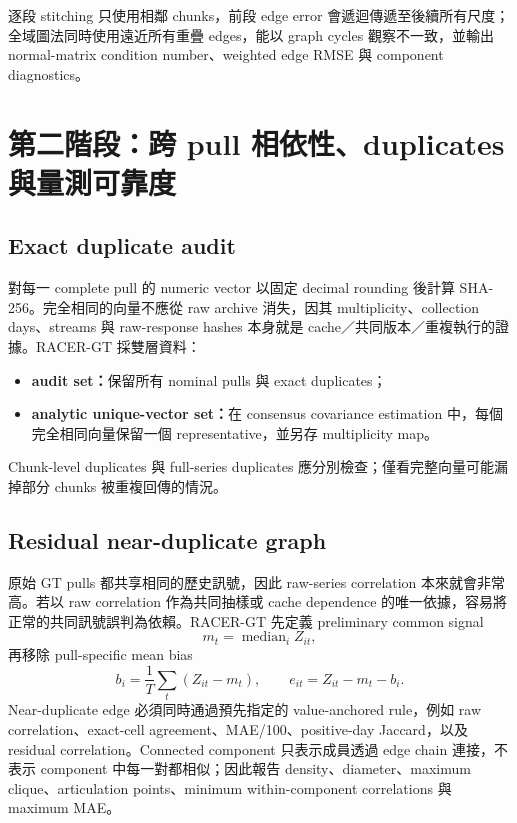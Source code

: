 \documentclass[12pt,a4paper,oneside]{article}
\begin{document}
逐段 stitching 只使用相鄰 chunks，前段 edge error 會遞迴傳遞至後續所有尺度；全域圖法同時使用遠近所有重疊 edges，能以 graph cycles 觀察不一致，並輸出 normal-matrix condition number、weighted edge RMSE 與 component diagnostics。

\section{第二階段：跨 pull 相依性、duplicates 與量測可靠度}

\subsection{Exact duplicate audit}

對每一 complete pull 的 numeric vector 以固定 decimal rounding 後計算 SHA-256。完全相同的向量不應從 raw archive 消失，因其 multiplicity、collection days、streams 與 raw-response hashes 本身就是 cache／共同版本／重複執行的證據。RACER-GT 採雙層資料：
\begin{itemize}
  \item \textbf{audit set：}保留所有 nominal pulls 與 exact duplicates；
  \item \textbf{analytic unique-vector set：}在 consensus covariance estimation 中，每個完全相同向量保留一個 representative，並另存 multiplicity map。
\end{itemize}

Chunk-level duplicates 與 full-series duplicates 應分別檢查；僅看完整向量可能漏掉部分 chunks 被重複回傳的情況。

\subsection{Residual near-duplicate graph}

原始 GT pulls 都共享相同的歷史訊號，因此 raw-series correlation 本來就會非常高。若以 raw correlation 作為共同抽樣或 cache dependence 的唯一依據，容易將正常的共同訊號誤判為依賴。RACER-GT 先定義 preliminary common signal
\begin{equation}
m_t=\operatorname{median}_i Z_{it},
\end{equation}
再移除 pull-specific mean bias
\begin{equation}
b_i=\frac{1}{T}\sum_t(Z_{it}-m_t),
\qquad
e_{it}=Z_{it}-m_t-b_i.
\label{eq:residualduplicate}
\end{equation}
Near-duplicate edge 必須同時通過預先指定的 value-anchored rule，例如 raw correlation、exact-cell agreement、MAE/100、positive-day Jaccard，以及 residual correlation。Connected component 只表示成員透過 edge chain 連接，不表示 component 中每一對都相似；因此報告 density、diameter、maximum clique、articulation points、minimum within-component correlations 與 maximum MAE。
\end{document}
